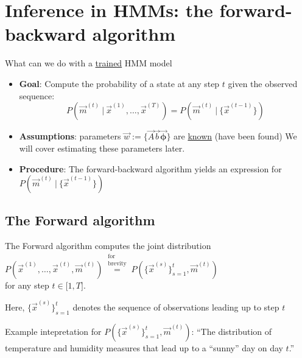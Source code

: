 \section{Inference in HMMs: the forward-backward algorithm}

\begin{frame} 
    \begin{center}
    What can we do with a \underline{trained} HMM model
    \end{center}
	
\end{frame}

\begin{frame}

\begin{itemize}
\item[] \textbf{Goal}: Compute the probability of a state at any step $t$ given the observed sequence:
\begin{equation}
P(\vec{m}^{(t)}  ~|~ \vec{x}^{(1)},  \ldots,\vec{x}^{(T)}) =
		P(\vec{m}^{(t)}  ~|~ \{\vec{x}^{(t-1)}\})
\end{equation}

\item[] \textbf{Assumptions}: parameters $\vec{w} := \{
		\vec{A}
		\vec{b}
		\vec{\boldsymbol{\phi}}
		\}$ are \underline{known} (have been found) We will cover estimating these parameters later.
\item[] \textbf{Procedure}: The forward-backward algorithm yields an expression for $P(\vec{m}^{(t)}  ~|~ \{\vec{x}^{(t-1)}\})$

\end{itemize}

\end{frame}

\subsection{The Forward algorithm}

\begin{frame}{\subsecname}

The Forward algorithm computes the joint distribution $P(\vec x^{(1)}, \ldots , \vec x^{(t)}, \vec m^{(t)}) \stackrel{\substack{\text{for}\\ \text{brevity}}}{=} P(\{\vec x^{(s)}\}_{s=1}^t, \vec m^{(t)})$\\
for any step $t \in \lbrack 1, T\rbrack$.\\

\svspace{5mm}

Here, $\{\vec x^{(s)}\}_{s=1}^t$ denotes the sequence of observations leading up to step $t$\\

\svspace{5mm}

Example intepretation for $P(\{\vec x^{(s)}\}_{s=1}^t, \vec m^{(t)})$: ``The distribution of temperature and humidity measures that lead up to a ``sunny'' day on day $t$.''

\end{frame}


